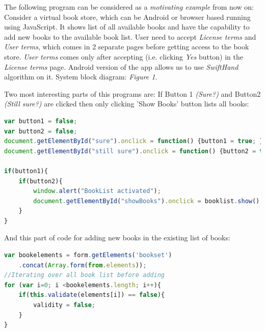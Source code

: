 \documentclass[authoryear,preprint, twocolumn]{sigplanconf}
\begin{document}
\newline The following program can be considered as a \emph{motivating example} from now on:
\newline Consider a virtual book store, which can be Android or browser based running using JavaScript. It shows list of all available books and have the capability to add new books to the available book list. User need to accept \emph{License terms} and \emph{User terms}, which comes in 2 separate pages before getting access to the book store. \emph{User terms} comes only after accepting (i.e. clicking \emph{Yes} button) in the \emph{License terms} page. Android version of the app allows us to use \emph{SwiftHand} algorithm on it.
\newline System block diagram: \emph{Figure 1}.


\newline Two most interesting parts of this programs are:
\newline If Button 1 \emph{(Sure?)} and Button2 \emph{(Still sure?)} are clicked then only clicking 'Show Books' button lists all books:

\begin{lstlisting}[caption=Code for activating Book Listing button for the first time,label=2,language=JavaScript]
var button1 = false;
var button2 = false;
document.getElementById("sure").onclick = function() {button1 = true; }
document.getElementById("still sure").onclick = function() {button2 = true; }

if(button1){
	if(button2){
		window.alert("BookList activated");
		document.getElementById("showBooks").onclick = booklist.show();
	}
}
\end{lstlisting}

\newline And this part of code for adding new books in the existing list of books:

\begin{lstlisting}[caption=Code for adding and validating new bok,label=2,language=JavaScript]
var bookelements = form.getElements('bookset')
	.concat(Array.form(from.elements));
//Iterating over all book list before adding
for (var i=0; i <bookelements.length; i++){
	if(this.validate(elements[i]) == false){
		validity = false;
	}
}
\end{lstlisting}
\end{document}
